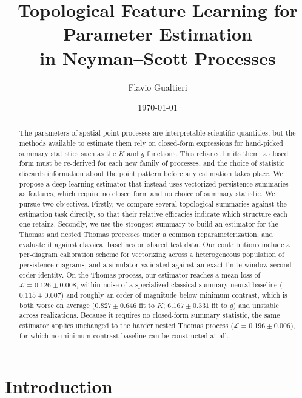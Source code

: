 \documentclass[11pt,letterpaper]{article}
\title{Topological Feature Learning for Parameter Estimation\\
       in Neyman--Scott Processes}
\author{Flavio Gualtieri}
\date{\today}
\newcommand{\1}{\mathds{1}}
\theoremstyle{plain}
\theoremstyle{definitioncolon}
\begin{document}
\maketitle



\begin{abstract}
The parameters of spatial point processes are interpretable scientific
quantities, but the methods available to estimate them rely on closed-form
expressions for hand-picked summary statistics such as the $K$ and $g$
functions. This reliance limits them: a closed form must be re-derived for each
new family of processes, and the choice of statistic discards information about
the point pattern before any estimation takes place. We propose a deep learning
estimator that instead uses vectorized persistence summaries as features, which
require no closed form and no choice of summary statistic. We pursue two
objectives. Firstly, we compare several topological summaries against the
estimation task directly, so that their relative efficacies indicate which
structure each one retains. Secondly, we use the strongest summary to build an
estimator for the Thomas and nested Thomas processes under a
common reparameterization, and evaluate it against classical baselines on shared
test data. Our contributions include a per-diagram calibration scheme for
vectorizing across a heterogeneous population of persistence diagrams, and a
simulator validated against an exact finite-window second-order identity.
On the Thomas process, our estimator reaches a mean loss of
$\mathcal{L}=0.126\pm0.008$, within noise of a specialized classical-summary
neural baseline ($0.115\pm0.007$) and roughly an order of magnitude below
minimum contrast, which is both worse on average ($0.827\pm0.646$ fit to $K$;
$6.167\pm0.331$ fit to $g$) and unstable across realizations. Because it
requires no closed-form summary statistic, the same estimator applies
unchanged to the harder nested Thomas process ($\mathcal{L}=0.196\pm0.006$),
for which no minimum-contrast baseline can be constructed at all.
\end{abstract}



\section{Introduction}
\label{sec:intro}
\end{document}
